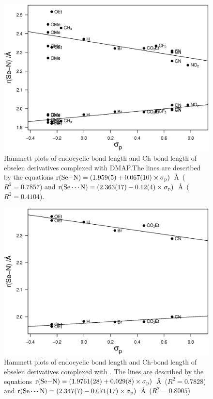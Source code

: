 \begin{refsection}
\begin{figure}
  \centering
  \includegraphics[width=0.7\linewidth]{Figures/hammett-dmap-para.eps}
  \caption[Hammett plots of endocyclic  bond length and  Ch-bond length of ebselen derivatives complexed with DMAP.]{Hammett plots of endocyclic  bond length and  Ch-bond length of ebselen derivatives complexed with DMAP.\@ The lines are described by the equations $\mathrm{r}(\ce{Se-N}) = (1.959(5) + 0.067(10) \times \sigma_\text{p})$~\AA~($R^2=0.7857$) and $\mathrm{r}(\ce{Se\cdots N}) = (2.363(17) - 0.12(4) \times \sigma_\text{p})$~\AA~($R^2=0.4104$).}\label{fig:hammett-dmap-para}
\end{figure}

\begin{figure}
\centering
\includegraphics[width=0.7\linewidth]{Figures/hammett-pyrrol-para.eps}
\caption[Hammett plots of endocyclic  bond length and  Ch-bond length of ebselen derivatives complexed with .]{Hammett plots of endocyclic  bond length and  Ch-bond length of ebselen derivatives complexed with . The lines are described by the equations $\mathrm{r}(\ce{Se-N}) = (1.9761(28) + 0.029(8) \times \sigma_\text{p})$~\AA~($R^2=0.7828$) and $\mathrm{r}(\ce{Se\cdots N}) = (2.347(7) - 0.071(17) \times \sigma_\text{p})$~\AA~($R^2=0.8005$)}\label{fig:hammett-pyrrol-para}
\end{figure}


\end{refsection}
